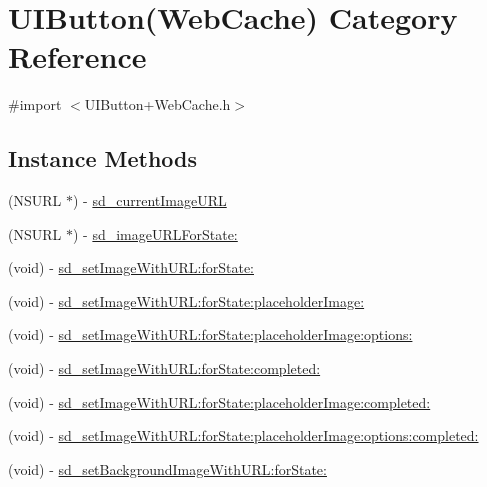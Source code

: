 \hypertarget{category_u_i_button_07_web_cache_08}{}\section{U\+I\+Button(Web\+Cache) Category Reference}
\label{category_u_i_button_07_web_cache_08}


{\ttfamily \#import $<$U\+I\+Button+\+Web\+Cache.\+h$>$}

\subsection*{Instance Methods}
\begin{DoxyCompactItemize}
\item 
(N\+S\+U\+RL $\ast$) -\/ \mbox{\hyperlink{category_u_i_button_07_web_cache_08_a8ea1e28175c50110fda5b08ccbcf9475}{sd\+\_\+current\+Image\+U\+RL}}
\item 
(N\+S\+U\+RL $\ast$) -\/ \mbox{\hyperlink{category_u_i_button_07_web_cache_08_a980c6b65dd457fcf4498763dd3e79ff0}{sd\+\_\+image\+U\+R\+L\+For\+State\+:}}
\item 
(void) -\/ \mbox{\hyperlink{category_u_i_button_07_web_cache_08_ae6bef75306491d9a3131b5fed0f86d88}{sd\+\_\+set\+Image\+With\+U\+R\+L\+:for\+State\+:}}
\item 
(void) -\/ \mbox{\hyperlink{category_u_i_button_07_web_cache_08_a22f64e3eb00aa106685f88eb6a7bc982}{sd\+\_\+set\+Image\+With\+U\+R\+L\+:for\+State\+:placeholder\+Image\+:}}
\item 
(void) -\/ \mbox{\hyperlink{category_u_i_button_07_web_cache_08_af3a743db1d88006184aec45641c645d0}{sd\+\_\+set\+Image\+With\+U\+R\+L\+:for\+State\+:placeholder\+Image\+:options\+:}}
\item 
(void) -\/ \mbox{\hyperlink{category_u_i_button_07_web_cache_08_abddfa42effe159e9f3089c474ad9753c}{sd\+\_\+set\+Image\+With\+U\+R\+L\+:for\+State\+:completed\+:}}
\item 
(void) -\/ \mbox{\hyperlink{category_u_i_button_07_web_cache_08_a2e2e51e7a885c288be6f071be9e4b2a0}{sd\+\_\+set\+Image\+With\+U\+R\+L\+:for\+State\+:placeholder\+Image\+:completed\+:}}
\item 
(void) -\/ \mbox{\hyperlink{category_u_i_button_07_web_cache_08_a45e790aa4c92ad7038a4be0d52a75187}{sd\+\_\+set\+Image\+With\+U\+R\+L\+:for\+State\+:placeholder\+Image\+:options\+:completed\+:}}
\item 
(void) -\/ \mbox{\hyperlink{category_u_i_button_07_web_cache_08_a089b2c745708bd54f980521be6755d59}{sd\+\_\+set\+Background\+Image\+With\+U\+R\+L\+:for\+State\+:}}

\end{DoxyCompactItemize}
